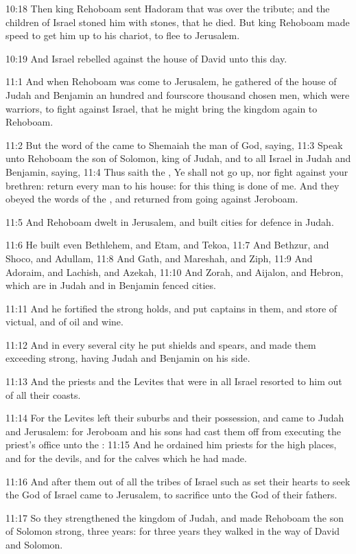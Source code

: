 10:18 Then king Rehoboam sent Hadoram that was over the tribute; and
the children of Israel stoned him with stones, that he died. But king
Rehoboam made speed to get him up to his chariot, to flee to
Jerusalem.

10:19 And Israel rebelled against the house of David unto this day.

11:1 And when Rehoboam was come to Jerusalem, he gathered of the house
of Judah and Benjamin an hundred and fourscore thousand chosen men,
which were warriors, to fight against Israel, that he might bring the
kingdom again to Rehoboam.

11:2 But the word of the \LORD came to Shemaiah the man of God, saying,
11:3 Speak unto Rehoboam the son of Solomon, king of Judah, and to all
Israel in Judah and Benjamin, saying, 11:4 Thus saith the \LORD, Ye
shall not go up, nor fight against your brethren: return every man to
his house: for this thing is done of me. And they obeyed the words of
the \LORD, and returned from going against Jeroboam.

11:5 And Rehoboam dwelt in Jerusalem, and built cities for defence in
Judah.

11:6 He built even Bethlehem, and Etam, and Tekoa, 11:7 And Bethzur,
and Shoco, and Adullam, 11:8 And Gath, and Mareshah, and Ziph, 11:9
And Adoraim, and Lachish, and Azekah, 11:10 And Zorah, and Aijalon,
and Hebron, which are in Judah and in Benjamin fenced cities.

11:11 And he fortified the strong holds, and put captains in them, and
store of victual, and of oil and wine.

11:12 And in every several city he put shields and spears, and made
them exceeding strong, having Judah and Benjamin on his side.

11:13 And the priests and the Levites that were in all Israel resorted
to him out of all their coasts.

11:14 For the Levites left their suburbs and their possession, and
came to Judah and Jerusalem: for Jeroboam and his sons had cast them
off from executing the priest's office unto the \LORD: 11:15 And he
ordained him priests for the high places, and for the devils, and for
the calves which he had made.

11:16 And after them out of all the tribes of Israel such as set their
hearts to seek the \LORD God of Israel came to Jerusalem, to sacrifice
unto the \LORD God of their fathers.

11:17 So they strengthened the kingdom of Judah, and made Rehoboam the
son of Solomon strong, three years: for three years they walked in the
way of David and Solomon.

